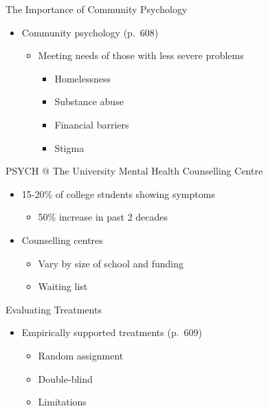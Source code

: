 \documentclass[
]{book}
\providecommand{\tightlist}{%
  \setlength{\itemsep}{0pt}\setlength{\parskip}{0pt}}
\begin{document}
\begin{reflect}
The Importance of Community Psychology

\begin{itemize}
\tightlist
\item
  Community psychology (p.~608)

  \begin{itemize}
  \tightlist
  \item
    Meeting needs of those with less severe problems

    \begin{itemize}
    \tightlist
    \item
      Homelessness\\
    \item
      Substance abuse\\
    \item
      Financial barriers\\
    \item
      Stigma
    \end{itemize}
  \end{itemize}
\end{itemize}

PSYCH @ The University Mental Health Counselling Centre

\begin{itemize}
\tightlist
\item
  15-20\% of college students showing symptoms

  \begin{itemize}
  \tightlist
  \item
    50\% increase in past 2 decades\\
  \end{itemize}
\item
  Counselling centres

  \begin{itemize}
  \tightlist
  \item
    Vary by size of school and funding\\
  \item
    Waiting list
  \end{itemize}
\end{itemize}

Evaluating Treatments

\begin{itemize}
\tightlist
\item
  Empirically supported treatments (p.~609)

  \begin{itemize}
  \tightlist
  \item
    Random assignment\\
  \item
    Double-blind\\
  \item
    Limitations


\end{itemize}
\end{itemize}
\end{reflect}
\end{document}
